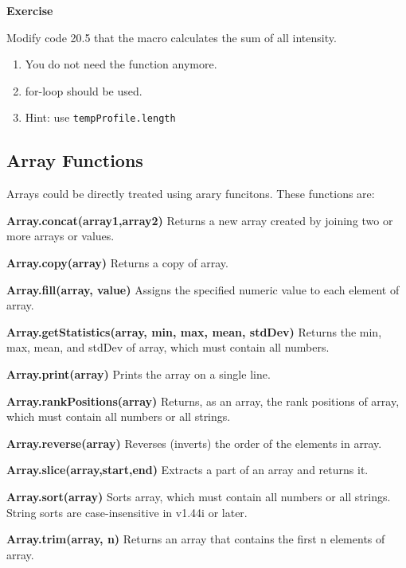 \documentclass[11pt,a4paper,oneside]{report}
\newenvironment{indentexercise}[1]%
{{\setlength{\leftmargin}{2em}}%
\textbf{Exercise \thesubsection-#1}%
\begin{list}{}%
	\item%
}
{\end{list}}
\newenvironment{indentCom}%
{\begin{list}{}%
         {\setlength{\leftmargin}{1em}}%
         \item[]%
}
{\end{list}}
\newcommand{\ilcom}[1]{\texttt{\small#1}}
\begin{document}
\begin{indentexercise}{1}
Modify code 20.5 that the macro calculates the sum of all intensity.\\
\begin{enumerate}
\item You do not need the function anymore. 
\item for-loop should be used.
\item Hint: use \ilcom{tempProfile.length}
\end{enumerate}
\end{indentexercise}

\subsection{Array Functions}

Arrays could be directly treated using arary funcitons. These functions are:
\begin{shaded}\begin{indentCom}
\item \textbf{Array.concat(array1,array2)} Returns a new array created by
joining two or more arrays or values. 
\item \textbf{Array.copy(array)} Returns a copy of array. 
\item \textbf{Array.fill(array, value)} Assigns the specified numeric value to
each element of array.
\item \textbf{Array.getStatistics(array, min, max, mean, stdDev)} Returns the
min, max, mean, and stdDev of array, which must contain all numbers.
\item \textbf{Array.print(array)} Prints the array on a single line. 
\item \textbf{Array.rankPositions(array)} Returns, as an array, the rank
positions of array, which must contain all numbers or all strings. 
\item \textbf{Array.reverse(array)} Reverses (inverts) the order of the
elements in array. 
\item \textbf{Array.slice(array,start,end)} Extracts a part of an array and
returns it. 
\item \textbf{Array.sort(array)} Sorts array, which must contain all numbers
or all strings. String sorts are case-insensitive in v1.44i or later.
\item \textbf{Array.trim(array, n)} Returns an array that contains the first n
elements of array.
\end{indentCom}\end{shaded}
\end{document}
